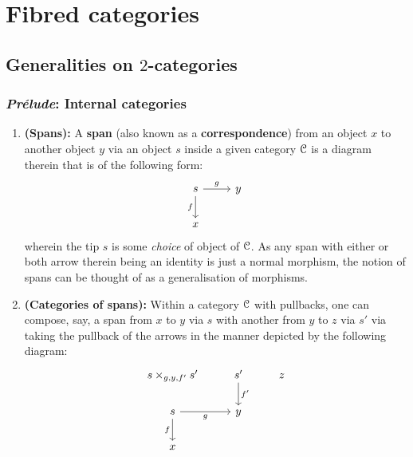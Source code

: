 \section{Fibred categories}
    \subsection{Generalities on \texorpdfstring{$2$}{}-categories}
        \subsubsection{\textit{Pr\'elude}: Internal categories}
            \begin{definition}[Spans] \label{def: spans} 
                \noindent
                \begin{enumerate}
                    \item \textbf{(Spans):} A \textbf{span} (also known as a \textbf{correspondence}) from an object $x$ to another object $y$ via an object $s$ inside a given category $\C$ is a diagram therein that is of the following form:
                        $$
                            \begin{tikzcd}
                            	s & y \\
                            	x
                            	\arrow["f"', from=1-1, to=2-1]
                            	\arrow["g", from=1-1, to=1-2]
                            \end{tikzcd}
                        $$
                    wherein the tip $s$ is some \textit{choice} of object of $\C$. As any span with either or both arrow therein being an identity is just a normal morphism, the notion of spans can be thought of as a generalisation of morphisms.  
                    \item \textbf{(Categories of spans):} Within a category $\C$ with pullbacks, one can compose, say, a span from $x$ to $y$ via $s$ with another from $y$ to $z$ via $s'$ via taking the pullback of the  arrows in the manner depicted by the following diagram:
                        $$
                            \begin{tikzcd}
                            	{s \x_{g, y, f'} s'} & {s'} & z \\
                            	s & y \\
                            	x
                            	\arrow["f"', from=2-1, to=3-1]
                            	\arrow["g"', from=2-1, to=2-2]
                            	\arrow["{f'}", from=1-2, to=2-2]

\end{tikzcd}$$
\end{enumerate}
\end{definition}
